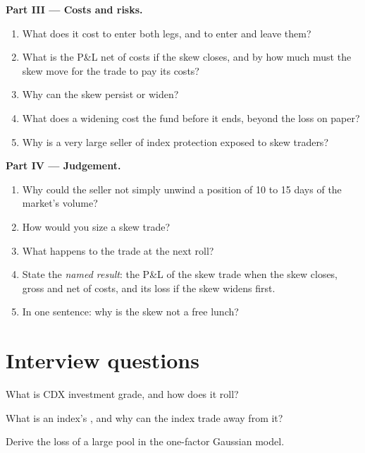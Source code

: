 \begin{problem}
\medskip\noindent\textbf{Part III --- Costs and risks.}
\begin{enumerate}[resume]
\item What does it cost to enter both legs, and to enter and leave them?
\item What is the P\&L net of costs if the skew closes, and by how much must the skew
move for the trade to pay its costs?
\item Why can the skew persist or widen?
\item What does a widening cost the fund before it ends, beyond the loss on paper?
\item Why is a very large seller of index protection exposed to skew traders?
\end{enumerate}

\medskip\noindent\textbf{Part IV --- Judgement.}
\begin{enumerate}[resume]
\item Why could the seller not simply unwind a position of 10 to 15 days of the
market's volume?
\item How would you size a skew trade?
\item What happens to the trade at the next roll?
\item State the \emph{named result}: the P\&L of the skew trade when the skew closes,
gross and net of costs, and its loss if the skew widens first.
\item In one sentence: why is the skew not a free lunch?
\end{enumerate}
\end{problem}

\section{Interview questions}

\begin{interviewq}\label{iq:m2:credit-indices-and-tranches:1}
What is CDX investment grade, and how does it roll?
\end{interviewq}

\begin{interviewq}\label{iq:m2:credit-indices-and-tranches:2}
What is an index's , and why can the index trade away from it?
\end{interviewq}

\begin{interviewq}\label{iq:m2:credit-indices-and-tranches:3}
Derive the loss of a large pool in the one-factor Gaussian model.
\end{interviewq}

